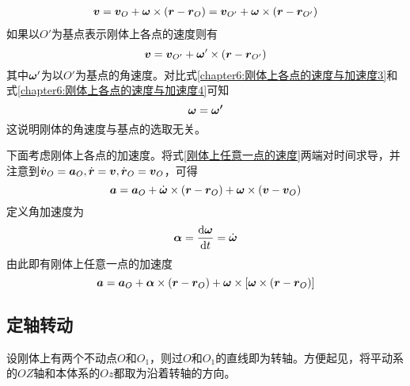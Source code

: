 \begin{align}
	\boldsymbol{v} = \boldsymbol{v}_O + \boldsymbol{\omega} \times (\boldsymbol{r}-\boldsymbol{r}_O) = \boldsymbol{v}_{O'} + \boldsymbol{\omega} \times (\boldsymbol{r}-\boldsymbol{r}_{O'})
	\label{chapter6:刚体上各点的速度与加速度3}
\end{align}
如果以$O'$为基点表示刚体上各点的速度则有
\begin{equation}
	\boldsymbol{v} = \boldsymbol{v}_{O'} + \boldsymbol{\omega}' \times (\boldsymbol{r}-\boldsymbol{r}_{O'})
	\label{chapter6:刚体上各点的速度与加速度4}
\end{equation}
其中$\boldsymbol{\omega}'$为以$O'$为基点的角速度。对比式\eqref{chapter6:刚体上各点的速度与加速度3}和式\eqref{chapter6:刚体上各点的速度与加速度4}可知
\begin{equation}
	\boldsymbol{\omega}=\boldsymbol{\omega'}
\end{equation}
这说明{\heiti 刚体的角速度与基点的选取无关}。

下面考虑刚体上各点的加速度。将式\eqref{刚体上任意一点的速度}两端对时间求导，并注意到$\dot{\boldsymbol{v}}_O = \boldsymbol{a}_O, \dot{\boldsymbol{r}} = \boldsymbol{v}, \dot{\boldsymbol{r}}_O = \boldsymbol{v}_O$，可得
\begin{equation*}
	\boldsymbol{a} = \boldsymbol{a}_O + \dot{\boldsymbol{\omega}} \times (\boldsymbol{r}-\boldsymbol{r}_O) + \boldsymbol{\omega} \times (\boldsymbol{v}-\boldsymbol{v}_O)
\end{equation*}
定义{\heiti 角加速度}为
\begin{equation}
	\boldsymbol{\alpha} = \frac{\mathrm{d} \boldsymbol{\omega}}{\mathrm{d} t} = \dot{\boldsymbol{\omega}}
\end{equation}
由此即有刚体上任意一点的加速度
\begin{equation}
	\boldsymbol{a} = \boldsymbol{a}_O + \boldsymbol{\alpha} \times (\boldsymbol{r}-\boldsymbol{r}_O) + \boldsymbol{\omega} \times \left[\boldsymbol{\omega} \times (\boldsymbol{r}-\boldsymbol{r}_O)\right]
	\label{刚体上任意一点的加速度}
\end{equation}

\subsection{定轴转动}

设刚体上有两个不动点$O$和$O_1$，则过$O$和$O_1$的直线即为转轴。方便起见，将平动系的$OZ$轴和本体系的$Oz$都取为沿着转轴的方向。

